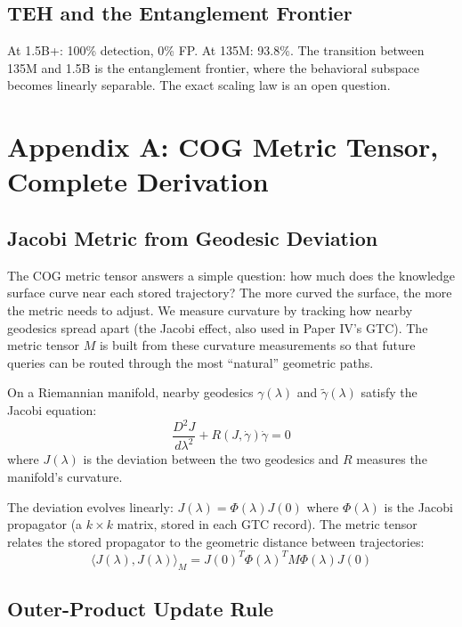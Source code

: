 \documentclass[11pt]{article}
\begin{document}
\subsection{TEH and the Entanglement Frontier}
At 1.5B+: 100\% detection, 0\% FP. At 135M: 93.8\%. The transition between 135M and 1.5B is the entanglement frontier, where the behavioral subspace becomes linearly separable. The exact scaling law is an open question.


\section{Appendix A: COG Metric Tensor, Complete Derivation}

\subsection{Jacobi Metric from Geodesic Deviation}

The COG metric tensor answers a simple question: how much does the knowledge
surface curve near each stored trajectory? The more curved the surface, the
more the metric needs to adjust. We measure curvature by tracking how nearby
geodesics spread apart (the Jacobi effect, also used in Paper IV's GTC). The
metric tensor $M$ is built from these curvature measurements so that future
queries can be routed through the most ``natural'' geometric paths.

On a Riemannian manifold, nearby geodesics $\gamma(\lambda)$ and $\tilde{\gamma}(\lambda)$ satisfy the Jacobi equation:
\begin{equation}
\frac{D^2 J}{d\lambda^2} + R(J, \dot{\gamma})\dot{\gamma} = 0
\end{equation}
where $J(\lambda)$ is the deviation between the two geodesics and $R$ measures the manifold's curvature.

The deviation evolves linearly: $J(\lambda) = \Phi(\lambda) J(0)$ where $\Phi(\lambda)$ is the Jacobi propagator (a $k \times k$ matrix, stored in each GTC record). The metric tensor relates the stored propagator to the geometric distance between trajectories:
\begin{equation}
\langle J(\lambda), J(\lambda) \rangle_M = J(0)^T \Phi(\lambda)^T M \Phi(\lambda) J(0)
\end{equation}

\subsection{Outer-Product Update Rule}
\end{document}

